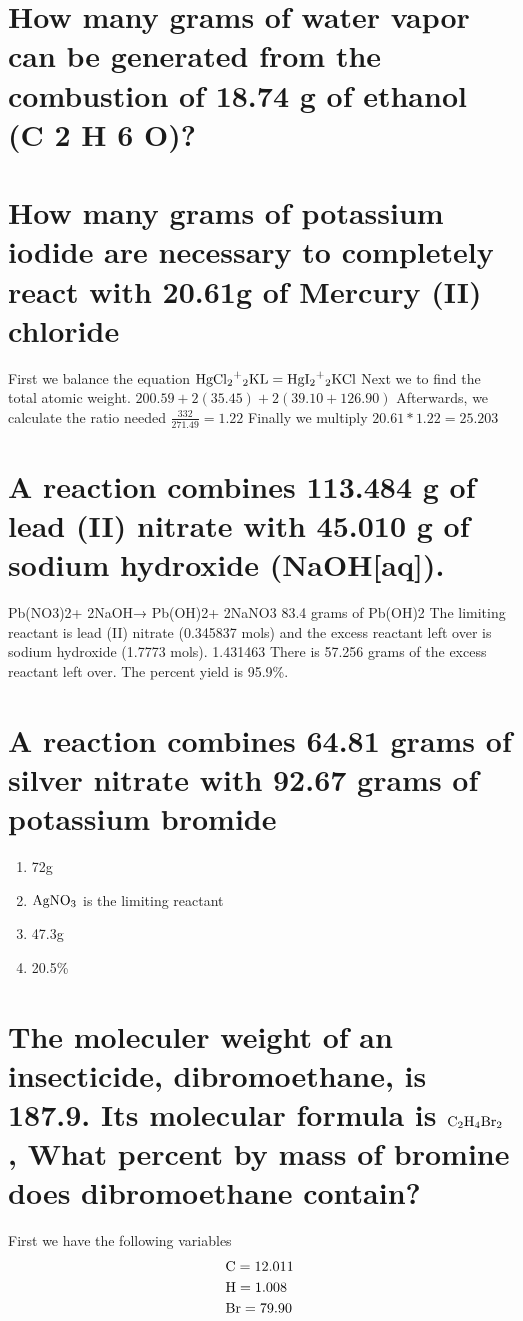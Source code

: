 \documentclass{scrartcl}
\begin{document}
\section{How many grams of water vapor can be generated from the combustion of 18.74 g of ethanol (C 2 H 6 O)?}
\label{sec:org0720694}

\section{How many grams of potassium iodide are necessary to completely react with 20.61g of Mercury (II) chloride}
\label{sec:org192a786}
First we balance the equation
\(\ce{HgCl2+2KL}=\ce{HgI2+2KCl}\)
Next we to find the total atomic weight.
\(200.59+2(35.45)+2(39.10+126.90)\)
Afterwards, we calculate the ratio needed
\(\frac{332}{271.49}=1.22\)
Finally we multiply
\(20.61*1.22=25.203\)

\section{A reaction combines 113.484 g of lead (II) nitrate with 45.010 g of sodium hydroxide (NaOH[aq]).}
\label{sec:org2ae540f}

Pb(NO3)2+ 2NaOH→ Pb(OH)2+ 2NaNO3
83.4 grams of Pb(OH)2
The limiting reactant is lead (II) nitrate (0.345837 mols) and the excess reactant left over is sodium hydroxide (1.7773 mols).   1.431463
There is 57.256 grams of the excess reactant left over.
The percent yield is 95.9\%.


\section{A reaction combines 64.81 grams of silver nitrate with 92.67 grams of potassium bromide}
\label{sec:org393aa82}
\begin{enumerate}
\item 72g
\item \(\ce{AgNO3}\) is the limiting reactant
\item 47.3g
\item 20.5\%
\end{enumerate}

\section{The moleculer weight of an insecticide, dibromoethane, is 187.9. Its molecular formula is \(\ce{C2H4Br2}\), What percent by mass of bromine does dibromoethane contain?}
\label{sec:org6f02154}
First we have the following variables
\begin{align*}
&\ce{C} = 12.011\\
&\ce{H} = 1.008\\
&\ce{Br} = 79.90
\end{align*}
\end{document}
